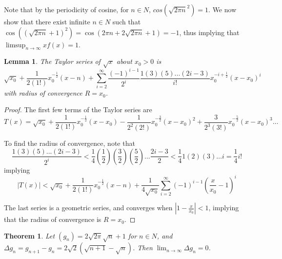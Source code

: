 \documentclass{amsart}
\newtheorem{theorem}{Theorem}[subsection]
\newtheorem{lemma}{Lemma}[subsubsection]
\begin{document}
Note that by the periodicity of cosine, for $n \in N$, $cos(\sqrt{2\pi n}^2) = 1$. We now show that there exist infinite $n \in N$ such that $\cos((\sqrt{2\pi n}+1)^2) = \cos(2\pi n + 2\sqrt{2 \pi n} + 1) = -1$, thus implying that $\limsup_{n\rightarrow\infty} xf(x) = 1$.

\begin{lemma}
\label{SquareRootTaylorSeries}
The Taylor series of $\sqrt{x}$ about $x_0>0$ is
\[
\sqrt{x_0} + \frac{1}{2(1!)} x_0^{-\frac{1}{2}}(x-n) + \sum_{i=2}^{\infty} \frac{(-1)^{i-1}}{2^i} \frac{1(3)(5)...(2i-3)}{i!} x_0^{-i + \frac{1}{2}}(x-x_0)^i
\]
with radius of convergence $R = x_0$.
\end{lemma}

\begin{proof}
The first few terms of the Taylor series are
\[
T(x) = \sqrt{x_0} + \frac{1}{2(1!)} x_0^{-\frac{1}{2}}(x-x_0)
- \frac{1}{2^2(2!)} x_0^{-\frac{3}{2}}(x-x_0)^2
+ \frac{3}{2^3(3!)} x_0^{-\frac{5}{2}}(x-x_0)^3 \dots
\]

To find the radius of convergence, note that
\[
\frac{1(3)(5)...(2i-3)}{2^i} < \frac{1}{4} \left(\frac{1}{2}\right)
\left(\frac{3}{2}\right)\left(\frac{5}{2}\right)\dots \frac{2i-3}{2} 
< \frac{1}{4} 1(2)(3)\dots i
= \frac{1}{4} i!
\]
implying
\[
|T(x)| < \sqrt{x_0} + \frac{1}{2(1!)} x_0^{-\frac{1}{2}}(x-n) 
+ \frac{1}{4\sqrt{x_0}}\sum_{i=2}^{\infty} (-1)^{i-1} \left(\frac{x}{x_0}-1\right)^i
\]

The last series is a geometric series, and converges when $|1-\frac{x}{x_0}| < 1$, implying that the radius of convergence is $R = x_0$.
\end{proof}

\begin{theorem}
\label{LimitDeltaGIs0}
Let $(g_n) = 2\sqrt{2 \pi}\sqrt{n} + 1$ for $n \in N$, and $\Delta g_n = g_{n+1} - g_n = 2\sqrt{2}(\sqrt{n+1} - \sqrt{n})$. Then $\lim_{n\rightarrow\infty} \Delta g_n = 0$.
\end{theorem}
\end{document}
